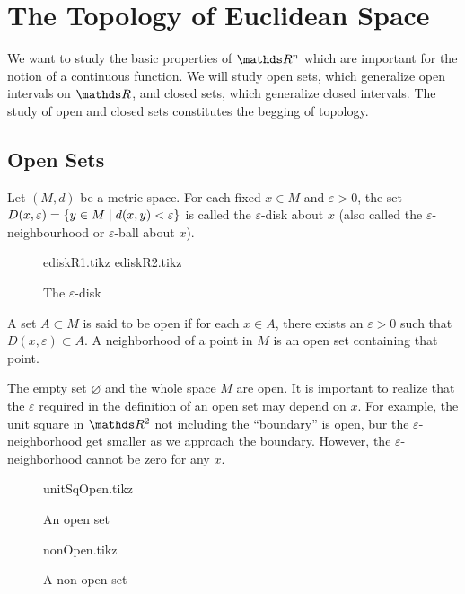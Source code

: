 \documentclass[../main-sheet.tex]{subfiles}
\begin{document}
\chapter{The Topology of Euclidean Space}
We want to study the basic properties of $ \R^n $ which are important for the notion of a continuous function. We will study open sets, which generalize open intervals on $ \R $, and closed sets, which generalize closed intervals. The study of open and closed sets constitutes the begging of topology.
\section{Open Sets}
\begin{defn}
    Let $ (M,d) $ be a metric space. For each fixed $ x\in M $ and $ \varepsilon>0  $, the set $ D(x,\varepsilon)=\left\{y\in M\mid d(x,y)<\varepsilon\right\} $ is called the $ \varepsilon $-disk about $ x $ (also called the $ \varepsilon $-neighbourhood or $ \varepsilon $-ball about $ x $).
    \begin{figure}[H]
        \centering
        {ediskR1.tikz}
        \hspace{2cm}
        {ediskR2.tikz}
        \caption{The $ \varepsilon $-disk}
    \end{figure}
\end{defn}
A set $ A\subset M $ is said to be open if for each $ x\in A $, there exists an $ \varepsilon>0 $ such that $ D(x,\varepsilon)\subset A  $. A neighborhood of a point in $ M $ is an open set containing that point.
\begin{note}
    The empty set $ \varnothing $ and the whole space $ M $ are open. It is important to realize that the $ \varepsilon $ required in the definition of an open set may depend on $ x $. For example, the unit square in $ \R^2 $ not including the ``boundary'' is open, bur the $ \varepsilon $-neighborhood get smaller as we approach the boundary. However, the $ \varepsilon $-neighborhood cannot be zero for any $ x $.
\end{note}
    \begin{figure}[H]
        \centering
        \begin{minipage}{0.45\textwidth}
            \centering
            {unitSqOpen.tikz}
            \caption{An open set}
        \end{minipage}\hfill
        \begin{minipage}{0.45\textwidth}
            \centering
            {nonOpen.tikz}
            \caption{A non open set}
        \end{minipage}
    \end{figure}
\end{document}
